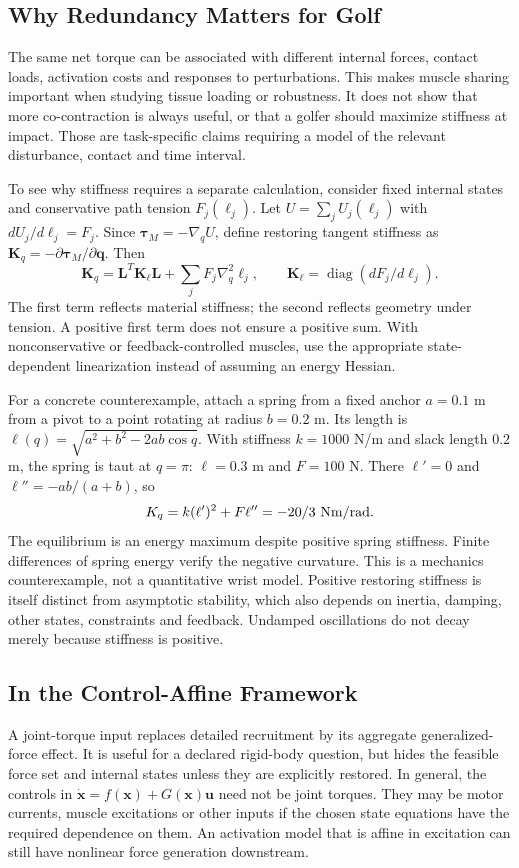 \subsection{Why Redundancy Matters for Golf}

The same net torque can be associated with different internal forces, contact loads, activation costs and responses to perturbations. This makes muscle sharing important when studying tissue loading or robustness. It does not show that more co-contraction is always useful, or that a golfer should maximize stiffness at impact. Those are task-specific claims requiring a model of the relevant disturbance, contact and time interval.

To see why stiffness requires a separate calculation, consider fixed internal states and conservative path tension $F_j(\ell_j)$. Let $U=\sum_j U_j(\ell_j)$ with $dU_j/d\ell_j=F_j$. Since $\bm\tau_M=-\nabla_qU$, define restoring tangent stiffness as $\bm K_q=-\partial\bm\tau_M/\partial\bm q$. Then
\[
\bm K_q=\bm L^T\bm K_\ell\bm L+
\sum_j F_j\nabla_q^2\ell_j,\qquad
\bm K_\ell=\operatorname{diag}(dF_j/d\ell_j).
\]
The first term reflects material stiffness; the second reflects geometry under tension. A positive first term does not ensure a positive sum. With nonconservative or feedback-controlled muscles, use the appropriate state-dependent linearization instead of assuming an energy Hessian.

For a concrete counterexample, attach a spring from a fixed anchor $a=0.1$ m from a pivot to a point rotating at radius $b=0.2$ m. Its length is $\ell(q)=\sqrt{a^2+b^2-2ab\cos q}$. With stiffness $k=1000$ N/m and slack length $0.2$ m, the spring is taut at $q=\pi$: $\ell=0.3$ m and $F=100$ N. There $\ell'=0$ and $\ell''=-ab/(a+b)$, so
\[
K_q=k(\ell')^2+F\ell''=-20/3\ {\rm Nm/rad}.
\]
The equilibrium is an energy maximum despite positive spring stiffness. Finite differences of spring energy verify the negative curvature. This is a mechanics counterexample, not a quantitative wrist model. Positive restoring stiffness is itself distinct from asymptotic stability, which also depends on inertia, damping, other states, constraints and feedback. Undamped oscillations do not decay merely because stiffness is positive.

\subsection{In the Control-Affine Framework}

A joint-torque input replaces detailed recruitment by its aggregate generalized-force effect. It is useful for a declared rigid-body question, but hides the feasible force set and internal states unless they are explicitly restored. In general, the controls in $\dot{\bm x}=f(\bm x)+G(\bm x)\bm u$ need not be joint torques. They may be motor currents, muscle excitations or other inputs if the chosen state equations have the required dependence on them. An activation model that is affine in excitation can still have nonlinear force generation downstream.

